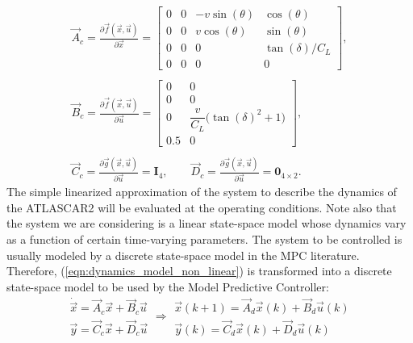 \begin{equation}
\begin{array}{ccc}
\vec{A}_c=\displaystyle\frac{\partial \vec{f}(\vec{x},\vec{u})}{\partial \vec{x}}=\begin{bmatrix}
0&0&-v\sin(\theta)&\cos(\theta)\\
0&0&v\cos(\theta)&\sin(\theta)\\
0&0&0&\tan(\delta)/C_L\\
0&0&0&0
\end{bmatrix},
\\\\
\vec{B}_c=\displaystyle\frac{\partial \vec{f}(\vec{x},\vec{u})}{\partial \vec{u}}=\begin{bmatrix}
0&0\\
0&0\\
0&\dfrac{v}{C_L}\big(\tan(\delta)^2+1\big)\\
0.5&0
\end{bmatrix},
\\\\
\vec{C}_c=\displaystyle\frac{\partial \vec{g}(\vec{x},\vec{u})}{\partial \vec{u}} = \mathbf{I}_4, 
\qquad
\vec{D}_c=\frac{\partial \vec{g}(\vec{x},\vec{u})}{\partial \vec{u}}=\mathbf{0}_{4\times2}.
\end{array}
\end{equation} 
The simple linearized approximation of the system to describe the dynamics of the ATLASCAR2 will be evaluated at the operating conditions. Note also that the system we are considering is a linear state-space model whose dynamics vary as a function of certain time-varying parameters. The system to be controlled is usually modeled by a discrete state-space model in the MPC literature. Therefore, (\ref{eqn:dynamics_model_non_linear})
is transformed into a discrete state-space model to be used by the Model Predictive Controller:
\begin{equation}
\label{eqn:dynamics_ss_obstacle_avoidance_dis}
\begin{array}{ll}
\dot{\vec{x}} =\vec{A}_c \vec{x}+ \vec{B}_c \vec{u}\\
\vec{y} =\vec{C}_c \vec{x} + \vec{D}_c \vec{u}
\end{array}
\Longrightarrow
\begin{array}{rr}
{\vec{x}}(k+1) =\vec{A}_d \vec{x}(k)+ \vec{B}_d \vec{u}(k)\\
\vec{y}(k) =\vec{C}_d \vec{x}(k) + \vec{D}_d \vec{u}(k)
\end{array}
\end{equation}

